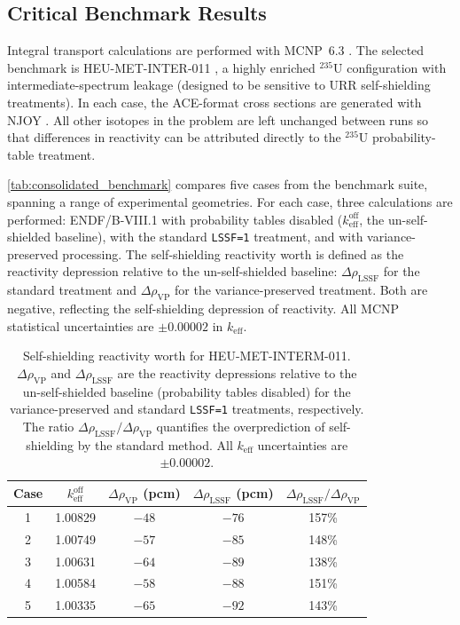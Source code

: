 \documentclass{style/nseJournal}
\newcommand{\isotope}[2]{\ensuremath{^{#1}\mathrm{#2}}}
\begin{document}
\subsection{Critical Benchmark Results}
\label{ssec:crit-benchmark-results}

Integral transport calculations are performed with \textsc{MCNP}~6.3 \cite{mcnp}. The selected benchmark is HEU-MET-INTER-011 \cite{icsbep,mcurie}, a highly enriched \isotope{235}{U} configuration with intermediate-spectrum leakage (designed to be sensitive to URR self-shielding treatments). In each case, the ACE-format cross sections are generated with NJOY \cite{njoy}. All other isotopes in the problem are left unchanged between runs so that differences in reactivity can be attributed directly to the \isotope{235}{U} probability-table treatment.

\autoref{tab:consolidated_benchmark} compares five cases from the benchmark suite, spanning a range of experimental geometries. For each case, three calculations are performed: ENDF/B-VIII.1 with probability tables disabled ($k_{\text{eff}}^{\text{off}}$, the un-self-shielded baseline), with the standard \texttt{LSSF=1} treatment, and with variance-preserved processing. The self-shielding reactivity worth is defined as the reactivity depression relative to the un-self-shielded baseline: $\Delta\rho_{\text{LSSF}}$ for the standard treatment and $\Delta\rho_{\text{VP}}$ for the variance-preserved treatment. Both are negative, reflecting the self-shielding depression of reactivity. All MCNP statistical uncertainties are $\pm 0.00002$ in $k_{\text{eff}}$.

\begin{table}[!t]
\centering
\caption{Self-shielding reactivity worth for HEU-MET-INTERM-011. $\Delta\rho_{\text{VP}}$ and $\Delta\rho_{\text{LSSF}}$ are the reactivity depressions relative to the un-self-shielded baseline (probability tables disabled) for the variance-preserved and standard \texttt{LSSF=1} treatments, respectively. The ratio $\Delta\rho_{\text{LSSF}}/\Delta\rho_{\text{VP}}$ quantifies the overprediction of self-shielding by the standard method. All $k_{\text{eff}}$ uncertainties are $\pm 0.00002$.}
\begin{tabular}{ccccc}
\toprule
Case & $k_{\text{eff}}^{\text{off}}$ & $\Delta\rho_{\text{VP}}$ (pcm) & $\Delta\rho_{\text{LSSF}}$ (pcm) & $\Delta\rho_{\text{LSSF}} / \Delta\rho_{\text{VP}}$ \\
\midrule
1 & 1.00829 & $-48$ & $-76$ & 157\% \\
2 & 1.00749 & $-57$ & $-85$ & 148\% \\
3 & 1.00631 & $-64$ & $-89$ & 138\% \\
4 & 1.00584 & $-58$ & $-88$ & 151\% \\
5 & 1.00335 & $-65$ & $-92$ & 143\% \\
\bottomrule
\end{tabular}
\label{tab:consolidated_benchmark}
\end{table}
\end{document}
